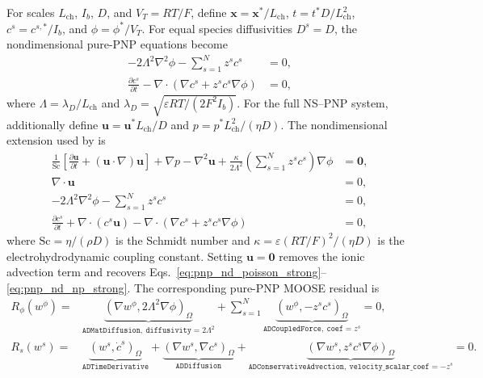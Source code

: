 \documentclass[3p,times]{elsarticle}
\begin{document}
For scales $L_{\mathrm{ch}}$, $I_b$, $D$, and $V_T=RT/F$, define $\boldsymbol{x}=\boldsymbol{x}^*/L_{\mathrm{ch}}$, $t=t^*D/L_{\mathrm{ch}}^2$, $c^s=c^{s,*}/I_b$, and $\phi=\phi^*/V_T$. For equal species diffusivities $D^s=D$, the nondimensional pure-PNP equations become
\begin{align}
  -2\Lambda^2\nabla^2\phi-\sum_{s=1}^{N}z^s c^s &=0,
  \label{eq:pnp_nd_poisson_strong}\\
  \frac{\partial c^s}{\partial t}-\nabla\cdot\left(\nabla c^s+z^s c^s\nabla\phi\right)&=0,
  \label{eq:pnp_nd_np_strong}
\end{align}
where $\Lambda=\lambda_D/L_{\mathrm{ch}}$ and $\lambda_D=\sqrt{\varepsilon RT/(2F^2I_b)}$. For the full NS--PNP system, additionally define $\boldsymbol{u}=\boldsymbol{u}^*L_{\mathrm{ch}}/D$ and $p=p^*L_{\mathrm{ch}}^2/(\eta D)$. The nondimensional extension used by \citet{kim2024direct} is
\begin{align}
  \frac{1}{\mathrm{Sc}}\left[\frac{\partial\boldsymbol{u}}{\partial t}+(\boldsymbol{u}\cdot\nabla)\boldsymbol{u}\right]+\nabla p-\nabla^2\boldsymbol{u}+\frac{\kappa}{2\Lambda^2}\left(\sum_{s=1}^{N}z^s c^s\right)\nabla\phi&=\boldsymbol{0},
  \label{eq:nspnp_nd_momentum}\\
  \nabla\cdot\boldsymbol{u}&=0,
  \label{eq:nspnp_nd_continuity}\\
  -2\Lambda^2\nabla^2\phi-\sum_{s=1}^{N}z^s c^s&=0,
  \label{eq:nspnp_nd_poisson}\\
  \frac{\partial c^s}{\partial t}+\nabla\cdot(c^s\boldsymbol{u})-\nabla\cdot\left(\nabla c^s+z^s c^s\nabla\phi\right)&=0,
  \label{eq:nspnp_nd_np}
\end{align}
where $\mathrm{Sc}=\eta/(\rho D)$ is the Schmidt number and $\kappa=\varepsilon(RT/F)^2/(\eta D)$ is the electrohydrodynamic coupling constant. Setting $\boldsymbol{u}=\boldsymbol{0}$ removes the ionic advection term and recovers Eqs.~\eqref{eq:pnp_nd_poisson_strong}--\eqref{eq:pnp_nd_np_strong}. The corresponding pure-PNP MOOSE residual is
\begin{align}
  R_\phi(w^\phi)={}&\underbrace{\left(\nabla w^\phi,2\Lambda^2\nabla\phi\right)_\Omega}_{\texttt{ADMatDiffusion},\ \texttt{diffusivity}=2\Lambda^2}+\sum_{s=1}^{N}\underbrace{\left(w^\phi,-z^s c^s\right)_\Omega}_{\texttt{ADCoupledForce},\ \texttt{coef}=z^s}=0,
  \label{eq:pnp_nd_poisson_moose}\\
  R_s(w^s)={}&\underbrace{\left(w^s,\dot{c}^s\right)_\Omega}_{\texttt{ADTimeDerivative}}+\underbrace{\left(\nabla w^s,\nabla c^s\right)_\Omega}_{\texttt{ADDiffusion}}+\underbrace{\left(\nabla w^s,z^s c^s\nabla\phi\right)_\Omega}_{\texttt{ADConservativeAdvection},\ \texttt{velocity\_scalar\_coef}=-z^s}=0.
  \label{eq:pnp_nd_species_moose}
\end{align}
\end{document}
